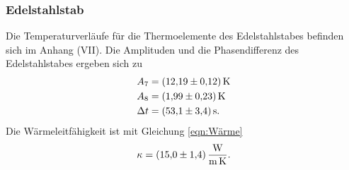 \subsubsection{Edelstahlstab}




Die Temperaturverläufe für die Thermoelemente des Edelstahlstabes befinden sich im Anhang (VII).
Die Amplituden und die Phasendifferenz des Edelstahlstabes ergeben sich zu
\begin{align*}
    A_{7} &= \SI{12.19 \pm 0.12}{\kelvin} \\
    A_{8} &= \SI{1.99 \pm 0.23}{\kelvin} \\
    \Delta t &= \SI{53.1 \pm 3.4}{\second}.
\end{align*}
Die Wärmeleitfähigkeit ist mit Gleichung \eqref{eqn:Wärme}
\begin{equation*}
    \kappa = \SI{15.0 \pm 1.4}{\watt\per\meter\per\kelvin}.
\end{equation*}
